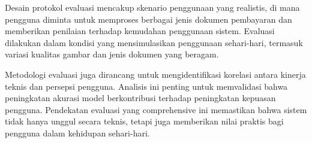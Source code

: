 Desain protokol evaluasi mencakup skenario penggunaan yang realistis, di mana pengguna diminta untuk memproses berbagai jenis dokumen pembayaran dan memberikan penilaian terhadap kemudahan penggunaan sistem. Evaluasi dilakukan dalam kondisi yang mensimulasikan penggunaan sehari-hari, termasuk variasi kualitas gambar dan jenis dokumen yang beragam.

Metodologi evaluasi juga dirancang untuk mengidentifikasi korelasi antara kinerja teknis dan persepsi pengguna. Analisis ini penting untuk memvalidasi bahwa peningkatan akurasi model berkontribusi terhadap peningkatan kepuasan pengguna. Pendekatan evaluasi yang comprehensive ini memastikan bahwa sistem tidak hanya unggul secara teknis, tetapi juga memberikan nilai praktis bagi pengguna dalam kehidupan sehari-hari.
